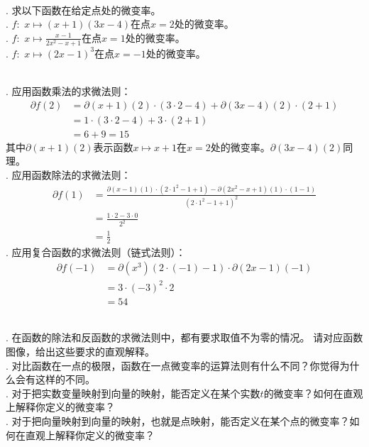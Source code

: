 \documentclass[12pt,UTF8,fontset=none]{ctexbook}
\begin{document}
\begin{et}
    \mbox{} \\
    . 求以下函数在给定点处的微变率。\\
    . $f: \,\, x \mapsto (x + 1)(3x -4)$在点$x = 2$处的微变率。\\
    . $f: \,\, x \mapsto \frac{x - 1}{2x^2 - x + 1}$在点$x = 1$处的微变率。\\
    . $f: \,\, x \mapsto (2x - 1)^3$在点$x = -1$处的微变率。\\
\end{et}

\begin{so}
    \mbox{} \\
    . 应用函数乘法的求微法则：
    \begin{align*}
        \partial f(2) &= \partial (x + 1) (2) \cdot (3 \cdot 2 - 4) + \partial (3x - 4) (2) \cdot (2 + 1)  \\
        &= 1 \cdot (3 \cdot 2 - 4) + 3 \cdot (2 + 1)  \\
        &= 6 + 9 = 15   
    \end{align*}
    其中$\partial (x + 1) (2)$表示函数$x\mapsto x + 1$在$x = 2$处的微变率。$\partial (3x - 4) (2)$同理。\\
    . 应用函数除法的求微法则：
    \begin{align*}
        \partial f(1) &= \frac{\partial (x - 1) (1) \cdot (2 \cdot 1^2 - 1 + 1) - \partial (2x^2 - x + 1) (1) \cdot (1 - 1)}{(2\cdot 1^2 - 1 + 1)^2}  \\
        &= \frac{ 1 \cdot 2 - 3 \cdot 0}{2^2}  \\
        &= \frac{1}{2}   
    \end{align*}
    . 应用复合函数的求微法则（链式法则）：
    \begin{align*}
        \partial f(-1) &= \partial (x^3) (2\cdot (-1) - 1) \cdot \partial (2x - 1) (-1)  \\
        &= 3\cdot (-3)^2 \cdot 2  \\
        &= 54   
    \end{align*}

\end{so}

\begin{sk}
    \mbox{} \\
    . 在函数的除法和反函数的求微法则中，都有要求取值不为零的情况。
    请对应函数图像，给出这些要求的直观解释。\\
    . 对比函数在一点的极限，函数在一点微变率的运算法则有什么不同？你觉得为什么会有这样的不同。\\
    . 对于把实数变量映射到向量的映射，能否定义在某个实数$t$的微变率？如何在直观上解释你定义的微变率？\\
    . 对于把向量映射到向量的映射，也就是点映射，能否定义在某个点的微变率？如何在直观上解释你定义的微变率？
    
\end{sk}
\end{document}
